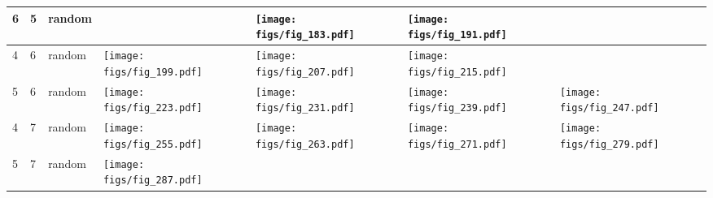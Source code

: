 \documentclass[oneside,canadian,landscape]{article}
\begin{document}
\begin{center}
\begin{longtable}{|l|l|l||l|l|l|l|}
6&5&random&&\begin{minipage}{3.5cm}
\texttt{[image: figs/fig\_183.pdf]}
\end{minipage}
&\begin{minipage}{3.5cm}
\texttt{[image: figs/fig\_191.pdf]}
\end{minipage}
&\\ \hline
4&6&random&\begin{minipage}{3.5cm}
\texttt{[image: figs/fig\_199.pdf]}
\end{minipage}
&\begin{minipage}{3.5cm}
\texttt{[image: figs/fig\_207.pdf]}
\end{minipage}
&\begin{minipage}{3.5cm}
\texttt{[image: figs/fig\_215.pdf]}
\end{minipage}
&\\ \hline
5&6&random&\begin{minipage}{3.5cm}
\texttt{[image: figs/fig\_223.pdf]}
\end{minipage}
&\begin{minipage}{3.5cm}
\texttt{[image: figs/fig\_231.pdf]}
\end{minipage}
&\begin{minipage}{3.5cm}
\texttt{[image: figs/fig\_239.pdf]}
\end{minipage}
&\begin{minipage}{3.5cm}
\texttt{[image: figs/fig\_247.pdf]}
\end{minipage}
\\ \hline
4&7&random&\begin{minipage}{3.5cm}
\texttt{[image: figs/fig\_255.pdf]}
\end{minipage}
&\begin{minipage}{3.5cm}
\texttt{[image: figs/fig\_263.pdf]}
\end{minipage}
&\begin{minipage}{3.5cm}
\texttt{[image: figs/fig\_271.pdf]}
\end{minipage}
&\begin{minipage}{3.5cm}
\texttt{[image: figs/fig\_279.pdf]}
\end{minipage}
\\ \hline
5&7&random&\begin{minipage}{3.5cm}
\texttt{[image: figs/fig\_287.pdf]}
\end{minipage}

\end{longtable}
\end{center}
\end{document}
